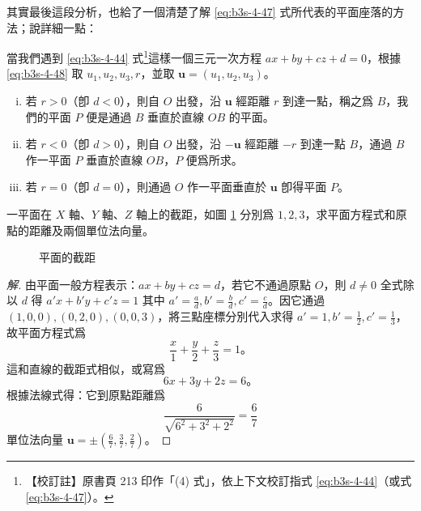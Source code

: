 其實最後這段分析，也給了一個清楚了解 \eqref{eq:b3s-4-47} 式所代表的平面座落的方法；說詳細一點：

當我們遇到 \eqref{eq:b3s-4-44} 式\footnote{\label{note:b3s-ch4-p213-equation-ref}【校訂註】原書頁 213 印作「(4) 式」，依上下文校訂指式 \eqref{eq:b3s-4-44}（或式 \eqref{eq:b3s-4-47}）。}這樣一個三元一次方程 $ax + by + cz + d = 0$，根據 \eqref{eq:b3s-4-48} 取 $u_1, u_2, u_3, r$，並取 $\mathbf{u} = (u_1, u_2, u_3)$。
\begin{enumerate}[(i)]
  \item 若 $r > 0$（卽 $d < 0$），則自 $O$ 出發，沿 $\mathbf{u}$ 經距離 $r$ 到達一點，稱之爲 $B$，我們的平面 $P$ 便是通過 $B$ 垂直於直線 $OB$ 的平面。
  \item 若 $r < 0$（卽 $d > 0$），則自 $O$ 出發，沿 $-\mathbf{u}$ 經距離 $-r$ 到達一點 $B$，通過 $B$ 作一平面 $P$ 垂直於直線 $OB$，$P$ 便爲所求。
  \item 若 $r = 0$（卽 $d = 0$），則通過 $O$ 作一平面垂直於 $\mathbf{u}$ 卽得平面 $P$。
\end{enumerate}

\begin{example}
一平面在 $X$ 軸、$Y$ 軸、$Z$ 軸上的截距，如圖 \ref{fig:4-68} 分別爲 $1, 2, 3$，求平面方程式和原點的距離及兩個單位法向量。
\end{example}

\begin{figure}[H]
\centering
{}
\caption{平面的截距}
\label{fig:4-68}
\end{figure}

\begin{proof}[解]
由平面一般方程表示：$ax + by + cz = d$，若它不通過原點 $O$，則 $d \neq 0$ 全式除以 $d$ 得 $a'x + b'y + c'z = 1$ 其中 $a' = \frac{a}{d}, b' = \frac{b}{d}, c' = \frac{c}{d}$。因它通過 $(1, 0, 0), (0, 2, 0), (0, 0, 3)$，將三點座標分別代入求得 $a' = 1, b' = \frac{1}{2}, c' = \frac{1}{3}$，故平面方程式爲
\[
\frac{x}{1} + \frac{y}{2} + \frac{z}{3} = 1\text{。}
\]
這和直線的截距式相似，或寫爲
\[
6x + 3y + 2z = 6\text{。}
\]
根據法線式得：它到原點距離爲
\[
\frac{6}{\sqrt{6^2 + 3^2 + 2^2}} = \frac{6}{7}
\]
單位法向量 $\mathbf{u} = \pm \left(\frac{6}{7}, \frac{3}{7}, \frac{2}{7}\right)$。 \qedhere
\end{proof}

